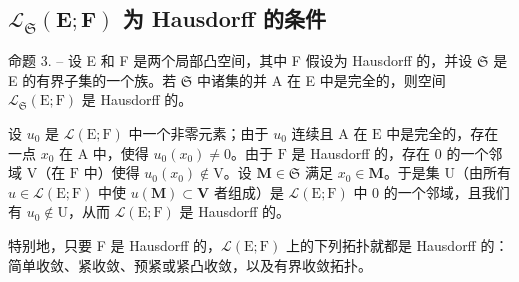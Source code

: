 \subsection{\texorpdfstring{\(\mathcal{L}_{\mathfrak{S}}(\mathbf{E};\mathbf{F})\) 为 Hausdorff 的条件}{\textbackslash mathcal\{L\}\_\{\textbackslash mathfrak\{S\}\}(\textbackslash mathbf\{E\};\textbackslash mathbf\{F\}) 为 Hausdorff 的条件}}

命题 3. -- 设 E 和 F 是两个局部凸空间，其中 F 假设为 Hausdorff 的，并设 \(\mathfrak{S}\) 是 E 的有界子集的一个族。若 \(\mathfrak{S}\) 中诸集的并 A 在 E 中是完全的，则空间 \(\mathcal{L}_{\mathfrak{S}}(\mathrm{E};\mathrm{F})\) 是 Hausdorff 的。

设 \(u_0\) 是 \(\mathcal{L}(\mathrm{E};\mathrm{F})\) 中一个非零元素；由于 \(u_0\) 连续且 \(\mathrm{A}\) 在 \(\mathrm{E}\) 中是完全的，存在一点 \(x_0\) 在 \(\mathrm{A}\) 中，使得 \(u_0(x_0) \neq 0\)。由于 \(\mathrm{F}\) 是 Hausdorff 的，存在 0 的一个邻域 \(\mathrm{V}\)（在 \(\mathrm{F}\) 中）使得 \(u_0(x_0) \notin \mathrm{V}\)。设 \(\mathbf{M} \in \mathfrak{S}\) 满足 \(x_0 \in \mathbf{M}\)。于是集 \(\mathrm{U}\)（由所有 \(u \in \mathcal{L}(\mathrm{E};\mathrm{F})\) 中使 \(u(\mathbf{M}) \subset \mathbf{V}\) 者组成）是 \(\mathcal{L}(\mathrm{E};\mathrm{F})\) 中 0 的一个邻域，且我们有 \(u_0 \notin \mathrm{U}\)，从而 \(\mathcal{L}(\mathrm{E};\mathrm{F})\) 是 Hausdorff 的。

特别地，只要 F 是 Hausdorff 的，\(\mathcal{L}(\mathrm{E};\mathrm{F})\) 上的下列拓扑就都是 Hausdorff 的：简单收敛、紧收敛、预紧或紧凸收敛，以及有界收敛拓扑。

